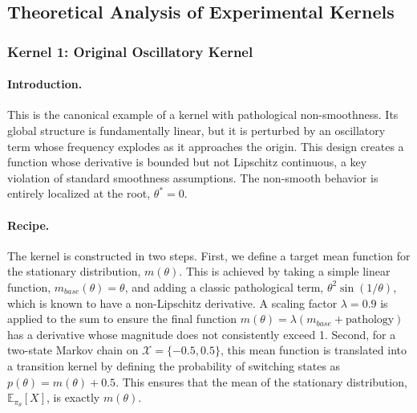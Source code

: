 \documentclass[a4paper]{article}
\begin{document}
\subsection*{Theoretical Analysis of Experimental Kernels}

\subsubsection*{Kernel 1: Original Oscillatory Kernel}

\paragraph{Introduction.}
This is the canonical example of a kernel with pathological non-smoothness. Its global structure is fundamentally linear, but it is perturbed by an oscillatory term whose frequency explodes as it approaches the origin. This design creates a function whose derivative is bounded but not Lipschitz continuous, a key violation of standard smoothness assumptions. The non-smooth behavior is entirely localized at the root, $\theta^*=0$.

\paragraph{Recipe.}
The kernel is constructed in two steps. First, we define a target mean function for the stationary distribution, $m(\theta)$. This is achieved by taking a simple linear function, $m_{base}(\theta) = \theta$, and adding a classic pathological term, $\theta^2 \sin(1/\theta)$, which is known to have a non-Lipschitz derivative. A scaling factor $\lambda=0.9$ is applied to the sum to ensure the final function $m(\theta) = \lambda(m_{base} + \text{pathology})$ has a derivative whose magnitude does not consistently exceed 1. Second, for a two-state Markov chain on $\mathcal{X}=\{-0.5, 0.5\}$, this mean function is translated into a transition kernel by defining the probability of switching states as $p(\theta) = m(\theta) + 0.5$. This ensures that the mean of the stationary distribution, $\mathbb{E}_{\pi_\theta}[X]$, is exactly $m(\theta)$.
\end{document}
